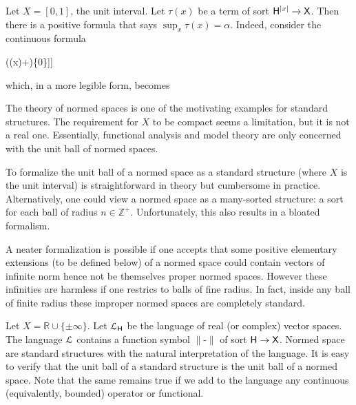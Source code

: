 \documentclass{amsproc}
\def\dotminus{\stackon[.2ex]{$-$}{$.$}}
\begin{document}
\begin{example}\label{ex_Rvlogic}
  Let $X=[0,1]$, the unit interval.
  Let $\tau(x)$ be a term of sort ${\sf H}^{|x|}\to {\sf X}$.
  Then there is a positive formula that says $\sup_x \tau(x)=\alpha$.
  Indeed, consider the continuous formula

  \ceq{\hfill\forall x\ \big[\tau(x)\dotminus\alpha\in\{0\}\big]}
  {\wedge}{\forall \varepsilon \Big[\varepsilon\in\{0\}\ \vee\ \exists x\ \big[\alpha\dotminus (\tau(x)+\varepsilon)\in\{0\}\big]\Big]}

  which, in a more legible form, becomes

\end{example}

The theory of normed spaces is one of the motivating examples for standard structures.
The requirement for $X$ to be compact seems a limitation, but it is not a real one.
Essentially, functional analysis and model theory are only concerned with the unit ball of normed spaces.

To formalize the unit ball of a normed space as a standard structure (where $X$ is the unit interval) is straightforward in theory but cumbersome in practice.
Alternatively, one could view a normed space as a many-sorted structure: a sort for each ball of radius $n\in\mathds{Z}^+$.
Unfortunately, this also results in a bloated formalism.

A neater formalization is possible if one accepts that some positive elementary extensions (to be defined below) of a normed space could contain vectors of infinite norm hence not be themselves proper normed spaces.
However these infinities are harmless if one restrics to balls of fine radius.
In fact, inside any ball of finite radius these improper normed spaces are completely standard.

\begin{example}\label{ex_normed_spaces}
Let $X=\mathds{R}\cup\{\pm\infty\}$.
Let ${\EuScript L}_{\sf H}$ be the language of real (or complex) vector spaces.
The language ${\EuScript L}$ contains a function symbol $\|\mbox{-}\|$ of sort ${\sf H}\to {\sf X}$.
Normed space are standard structures with the natural interpretation of the language.
It is easy to verify that the unit ball of a standard structure is the unit ball of a normed space.
Note that the same remains true if we add to the language any continuous (equivalently, bounded) operator or functional.
\end{example}
\end{document}
